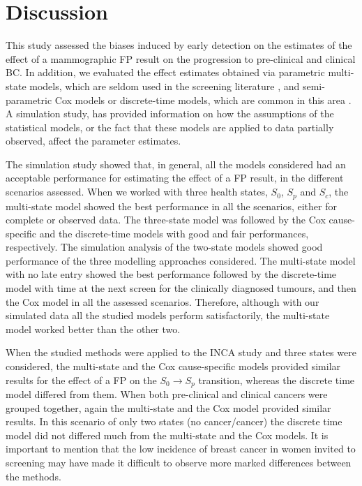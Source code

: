 \documentclass{bmcart}
\begin{document}
\section*{Discussion}
This study assessed the biases induced by early detection on the estimates of the effect of a
mammographic FP result on the progression to pre-clinical and clinical BC. In addition, we
evaluated the effect estimates obtained via parametric multi-state models, which are seldom used in
the screening literature \cite{Uhry2010, Putter2006}, and semi-parametric Cox models or
discrete-time models, which are common in this area \cite{Hofvind2006, Blanch2013,
VonEuler-Chelpin2012, Castells2013b, Blanch2014, Ripping2016}. A simulation study, has provided
information on how the assumptions of the statistical models, or the fact that these models are
applied to data partially observed, affect the parameter estimates. 

The simulation study showed that, in general, all the models considered had an acceptable
performance for estimating the effect of a FP result, in the different scenarios assessed. When we
worked with three health states, $S_0$, $S_p$ and $S_c$, the multi-state model showed the best
performance in all the scenarios, either for complete or observed data. The three-state model was
followed by the Cox cause-specific and the discrete-time models with good and fair performances,
respectively. The simulation analysis of the two-state models showed good performance of the three
modelling approaches considered. The multi-state model with no late entry showed the best
performance followed by the discrete-time model with time at the next screen for the clinically
diagnosed tumours, and then the Cox model in all the assessed scenarios. Therefore, although with
our simulated data all the studied models perform satisfactorily, the multi-state model worked
better than the other two.

When the studied methods were applied to the INCA study and three states were considered, the
multi-state and the Cox cause-specific models provided similar results for the effect of a FP on
the $S_0 \rightarrow S_p$ transition, whereas the discrete time model differed from them. When both
pre-clinical and clinical cancers were grouped together, again the multi-state and the Cox model
provided similar results. In this scenario of only two states (no cancer/cancer) the discrete time
model did not differed much from the multi-state and the Cox models. It is important to mention
that the low incidence of breast cancer in women invited to screening may have made it difficult to
observe more marked differences between the methods.
\end{document}
